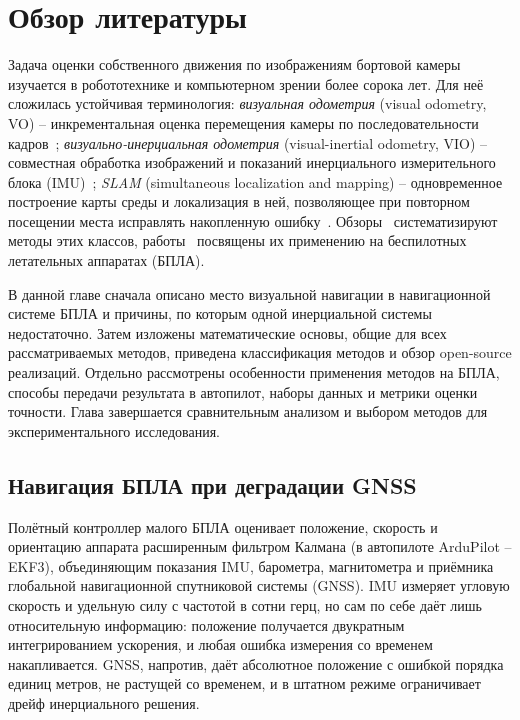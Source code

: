     \section{Обзор литературы}\label{sec:review}

    Задача оценки собственного движения по изображениям бортовой камеры изучается в робототехнике и компьютерном зрении более сорока лет.
    Для неё сложилась устойчивая терминология: \textit{визуальная одометрия} (visual odometry, VO) -- инкрементальная оценка перемещения камеры по последовательности кадров~\cite{nister_vo, vo_tutorial1}; \textit{визуально-инерциальная одометрия} (visual-inertial odometry, VIO) -- совместная обработка изображений и показаний инерциального измерительного блока (IMU)~\cite{vins_review}; \textit{SLAM} (simultaneous localization and mapping) -- одновременное построение карты среды и локализация в ней, позволяющее при повторном посещении места исправлять накопленную ошибку~\cite{slam_survey}.
    Обзоры~\cite{vo_tutorial1, vo_tutorial2, slam_survey, vins_review} систематизируют методы этих классов, работы~\cite{uav_vision_survey, avl_review} посвящены их применению на беспилотных летательных аппаратах (БПЛА).

    В данной главе сначала описано место визуальной навигации в навигационной системе БПЛА и причины, по которым одной инерциальной системы недостаточно.
    Затем изложены математические основы, общие для всех рассматриваемых методов, приведена классификация методов и обзор open-source реализаций.
    Отдельно рассмотрены особенности применения методов на БПЛА, способы передачи результата в автопилот, наборы данных и метрики оценки точности.
    Глава завершается сравнительным анализом и выбором методов для экспериментального исследования.

    \subsection{Навигация БПЛА при деградации GNSS}

    Полётный контроллер малого БПЛА оценивает положение, скорость и ориентацию аппарата расширенным фильтром Калмана (в автопилоте ArduPilot -- EKF3), объединяющим показания IMU, барометра, магнитометра и приёмника глобальной навигационной спутниковой системы (GNSS).
    IMU измеряет угловую скорость и удельную силу с частотой в сотни герц, но сам по себе даёт лишь относительную информацию: положение получается двукратным интегрированием ускорения, и любая ошибка измерения со временем накапливается.
    GNSS, напротив, даёт абсолютное положение с ошибкой порядка единиц метров, не растущей со временем, и в штатном режиме ограничивает дрейф инерциального решения.

